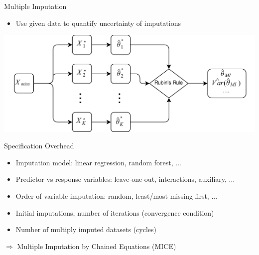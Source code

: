 \documentclass[aspectratio=43]{beamer}
\begin{document}
\begin{frame}{Multiple Imputation}
\begin{itemize}
\item Use given data to quantify uncertainty of imputations
\end{itemize}
\phantom{This text will be invisible} 
\centering
\includegraphics[width=0.9\paperwidth]{MI}
\end{frame}

\begin{frame}{Specification Overhead}
\begin{itemize}
\item Imputation model: linear regression, random forest, ...
\item Predictor vs response variables: leave-one-out, interactions, auxiliary, ...
\item Order of variable imputation: random, least/most missing first, ...
\item Initial imputations, number of iterations (convergence condition)
\item Number of multiply imputed datasets (cycles)
\end{itemize}
\phantom{This text will be invisible invisible invisible invisible invisible invisible} 
 $\Rightarrow$ Multiple Imputation by Chained Equations (MICE)
\end{frame}
\end{document}
